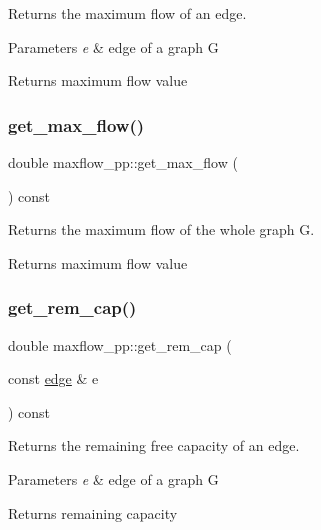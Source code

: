Returns the maximum flow of an edge.


\begin{DoxyParams}{Parameters}
{\em e} & edge of a graph {\ttfamily G} \\
\hline
\end{DoxyParams}
\begin{DoxyReturn}{Returns}
maximum flow value 
\end{DoxyReturn}
\mbox{\label{classmaxflow__pp_a72210f8ac7aeca0a58e7407681003083}} 
\subsubsection{\texorpdfstring{get\+\_\+max\+\_\+flow()}{get\_max\_flow()}\hspace{0.1cm}{\footnotesize\ttfamily [2/2]}}
{\footnotesize\ttfamily double maxflow\+\_\+pp\+::get\+\_\+max\+\_\+flow (\begin{DoxyParamCaption}{ }\end{DoxyParamCaption}) const}

Returns the maximum flow of the whole graph {\ttfamily G}.

\begin{DoxyReturn}{Returns}
maximum flow value 
\end{DoxyReturn}
\mbox{\label{classmaxflow__pp_ab3af0c0568ff2c8295166bfd75736169}} 
\subsubsection{\texorpdfstring{get\+\_\+rem\+\_\+cap()}{get\_rem\_cap()}}
{\footnotesize\ttfamily double maxflow\+\_\+pp\+::get\+\_\+rem\+\_\+cap (\begin{DoxyParamCaption}\item[{const \mbox{\hyperlink{classedge}{edge}} \&}]{e }\end{DoxyParamCaption}) const}

Returns the remaining free capacity of an edge.


\begin{DoxyParams}{Parameters}
{\em e} & edge of a graph G \\
\hline
\end{DoxyParams}
\begin{DoxyReturn}{Returns}
remaining capacity 
\end{DoxyReturn}
\mbox{\label{classmaxflow__pp_a479e6e218f81d20acdc706b5771e38cb}} 
